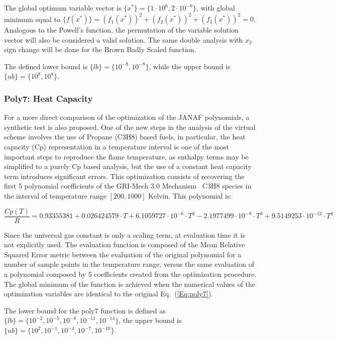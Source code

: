 \documentclass[10pt,fleqn,a4paper,twoside]{article}
\begin{document}
The global optimum variable vector is $\{x^*\} = \{1\cdot10^6, 2\cdot10^{ -6} \}$, with global minimum equal to $\{f(x^*)\} = (f_1(x^*))^2 + (f_2(x^*))^2 + (f_3(x^*))^2= 0$. Analogous to 
the Powell's function, the permutation of the variable solution vector will also be considered a valid solution. The same double analysis with $x_2$ sign change will be done for the Brown
Badly Scaled function.

The defined lower bound is $\{lb\} = \{10^{-8}, 10^{-8}\}$, while the upper bound is $\{ub\} = \{10^{8}, 10^{8}\}$.


\subsubsection{Poly7: Heat Capacity}
For a more direct comparison of the optimization of the JANAF polynomials, a synthetic test is also proposed. One of the new steps in the analysis of the virtual scheme involves the use of Propane (C3H8) based
fuels, in particular, the heat capacity (Cp) representation in a temperature interval is one of the most important steps to reproduce the flame temperature, as enthalpy terms may be simplified to a 
purely Cp based analysis, but the use of a constant heat capacity term introduces significant errors. This optimization consists of recovering the first 5 polynomial coefficients of the GRI-Mech 3.0
Mechanism~\citep{GRIMech30} C3H8 species in the interval of temperature range $[200, 1000]$ Kelvin. This polynomial is:

\begin{equation}
\frac{Cp(T)}{R} = 0.93355381 +  0.026424579 \cdot T +  6.1059727\cdot10^{-6} \cdot T^2 - 2.1977499\cdot10^{-8} \cdot T^3 + 9.5149253\cdot 10^{-12} \cdot T^4
\label{Eq:poly7}
\end{equation}

Since the universal gas constant is only a scaling term, at evaluation time it is not explicitly used. The evaluation function is composed of the Mean Relative Squared Error metric between the 
evaluation of the original polynomial for a number of sample points in the temperature range, versus the same evaluation of a polynomial composed by 5 coefficients created from the optimization
procedure. The global minimum of the function is achieved when the numerical values of the optimization variables are identical to the original Eq.~(\ref{Eq:poly7}). 

The lower bound for the poly7 function is defined as $\{lb\} = \{10^{-2}, 10^{-5}, 10^{-8}, 10^{-11}, 10^{-14}\}$, the upper bound is $\{ub\} = \{10^{2}, 10^{-1}, 10^{-4}, 10^{-7}, 10^{-10}\}$.
\end{document}
